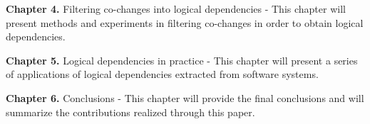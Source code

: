 \documentclass[12pt]{mitthesis}
\begin{document}
\textbf{Chapter 4.} Filtering co-changes into logical dependencies - This chapter will present methods and experiments in filtering co-changes in order to obtain logical dependencies.

\textbf{Chapter 5.} Logical dependencies in practice - This chapter will present a series of applications of logical dependencies extracted from software systems.

\textbf{Chapter 6.} Conclusions - This chapter will provide the final conclusions and will summarize the contributions realized through this paper.



\end{document}
